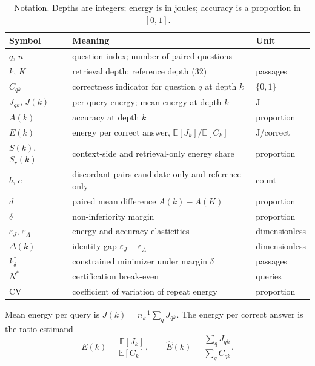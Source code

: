 \documentclass[a4paper,fleqn]{cas-sc}
\begin{document}
\begin{table}[pos=htbp]
  \centering
  \caption{Notation. Depths are integers; energy is in joules; accuracy is a proportion in $[0,1]$.}
  \label{tab:notation}
  \footnotesize
  \begin{tabular}{@{}lll@{}}
    \toprule
    \textbf{Symbol} & \textbf{Meaning} & \textbf{Unit} \\
    \midrule
    $q$, $n$ & question index; number of paired questions & --- \\
    $k$, $K$ & retrieval depth; reference depth (32) & passages \\
    $C_{qk}$ & correctness indicator for question $q$ at depth $k$ & $\{0,1\}$ \\
    $J_{qk}$, $J(k)$ & per-query energy; mean energy at depth $k$ & J \\
    $A(k)$ & accuracy at depth $k$ & proportion \\
    $E(k)$ & energy per correct answer, $\mathbb{E}[J_k]/\mathbb{E}[C_k]$ & J/correct \\
    $S(k)$, $S_r(k)$ & context-side and retrieval-only energy share & proportion \\
    $b$, $c$ & discordant pairs candidate-only and reference-only & count \\
    $d$ & paired mean difference $A(k)-A(K)$ & proportion \\
    $\delta$ & non-inferiority margin & proportion \\
    $\varepsilon_J$, $\varepsilon_A$ & energy and accuracy elasticities & dimensionless \\
    $\Delta(k)$ & identity gap $\varepsilon_J-\varepsilon_A$ & dimensionless \\
    $k^{*}_{\delta}$ & constrained minimizer under margin $\delta$ & passages \\
    $N^{*}$ & certification break-even & queries \\
    $\mathrm{CV}$ & coefficient of variation of repeat energy & proportion \\
    \bottomrule
  \end{tabular}
\end{table} Mean energy per query is $J(k)=n_{k}^{-1}\sum_{q}J_{qk}$. The energy per correct answer is the ratio estimand
\begin{equation}\label{eq:ratio}
  E(k)=\frac{\mathbb{E}[J_{k}]}{\mathbb{E}[C_{k}]},
  \qquad
  \widehat E(k)=\frac{\sum_{q}J_{qk}}{\sum_{q}C_{qk}} .
\end{equation}
\end{document}
